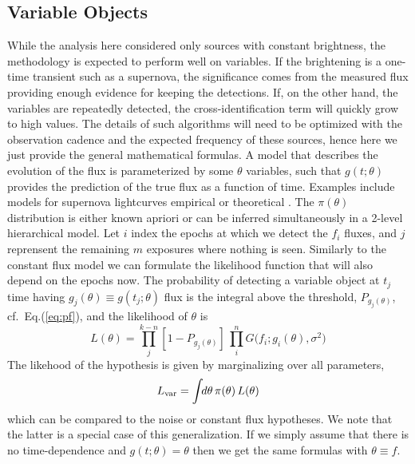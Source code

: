 \documentclass[twocolumn]{emulateapj}
\begin{document}
\subsection{Variable Objects}
\label{sec:var}
\noindent
While the analysis here considered only sources with constant brightness, the methodology is expected to perform well on variables. If the brightening is a one-time transient such as a supernova, the significance comes from the measured flux providing enough evidence for keeping the detections.
%
If, on the other hand, the variables are repeatedly detected, the cross-identification term will quickly grow to high values. The details of such algorithms will need to be optimized with the observation cadence and the expected frequency of these sources, hence here we just provide the general mathematical formulas.
%
A model that describes the evolution of the flux is parameterized by some $\theta$ variables, such that $g(t;\theta)$ provides the prediction of the true flux as a function of time. Examples include models for supernova lightcurves empirical or theoretical \citep{riess95,snana}. The $\pi(\theta)$ distribution is either known apriori or can be inferred simultaneously in a 2-level hierarchical model.
%
Let $i$ index the epochs at which we detect the $f_i$ fluxes, and $j$ reprensent the remaining $m$ exposures where nothing is seen.
%
Similarly to the constant flux model we can formulate the likelihood function that will also depend on the epochs now. The probability of detecting a variable object at $t_j$ time having
\mbox{$g_j(\theta)\equiv{}g(t_j;\theta)$} flux is the integral above the threshold, $P_{g_j(\theta)}$, cf.\ Eq.(\ref{eq:pf}), and the likelihood of  $\theta$ is
%
\begin{equation}
L(\theta) = \prod_j^{k-n} \left[1\!-\!P_{g_j(\theta)}\right]\,\prod_i^n G\big(f_i;g_i(\theta),\sigma^2\big)
\end{equation}
%
The likehood of the hypothesis is given by marginalizing over all parameters,
%
\begin{equation}
L_{\rm{}var} = \int{}\!\!d\theta\,\pi(\theta)\,L(\theta)
\end{equation}
%
which can be compared to the noise or constant flux hypotheses.
%
We note that the latter is a special case of this generalization.
If we simply assume that there is no time-dependence and \mbox{$g(t;\theta)\!=\!\theta$} then we get the same formulas with \mbox{$\theta\!\equiv{}\!f$}.
\end{document}
